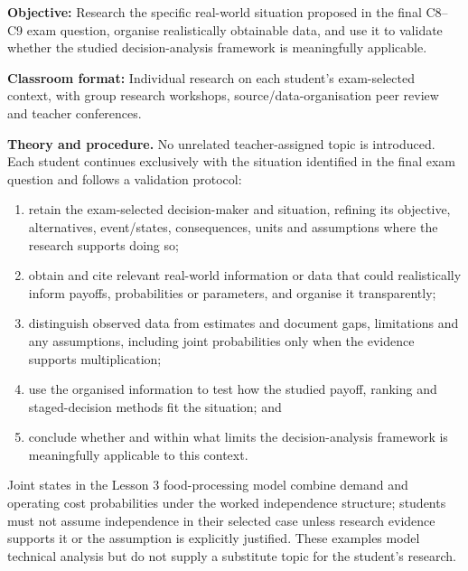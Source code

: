 \documentclass[10pt,letterpaper]{article}
\newcommand{\labelled}[2]{\textbf{#1:} #2\par}
\newcommand{\partheading}[1]{\Needspace{7\baselineskip}\par\vspace{4pt}{\bfseries #1\par}}
\begin{document}
\partheading{Part 3---C10: Validate a Student-Selected Real-World Application}
\labelled{Objective}{Research the specific real-world situation proposed in the final C8--C9 exam question, organise realistically obtainable data, and use it to validate whether the studied decision-analysis framework is meaningfully applicable.}
\labelled{Classroom format}{Individual research on each student's exam-selected context, with group research workshops, source/data-organisation peer review and teacher conferences.}
\textbf{Theory and procedure.} No unrelated teacher-assigned topic is
introduced. Each student continues exclusively with the situation identified
in the final exam question and follows a validation protocol:
\begin{enumerate}[leftmargin=2em,itemsep=1pt]
\item retain the exam-selected decision-maker and situation, refining its objective, alternatives, event/states, consequences, units and assumptions where the research supports doing so;
\item obtain and cite relevant real-world information or data that could realistically inform payoffs, probabilities or parameters, and organise it transparently;
\item distinguish observed data from estimates and document gaps, limitations and any assumptions, including joint probabilities only when the evidence supports multiplication;
\item use the organised information to test how the studied payoff, ranking and staged-decision methods fit the situation; and
\item conclude whether and within what limits the decision-analysis framework is meaningfully applicable to this context.
\end{enumerate}
Joint states in the Lesson 3 food-processing model combine demand and operating
cost probabilities under the worked independence structure; students must not
assume independence in their selected case unless research evidence supports
it or the assumption is explicitly justified. These examples model technical
analysis but do not supply a substitute topic for the student's research.
\end{document}
